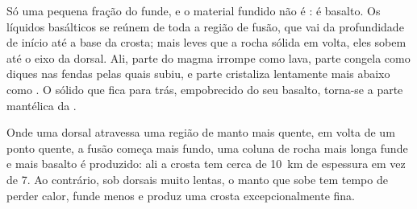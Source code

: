 Só uma pequena fração do  funde, e o material fundido não é
: é basalto. Os líquidos basálticos se reúnem de toda a região de
fusão, que vai da profundidade de início até a base da crosta; mais leves
que a rocha sólida em volta, eles sobem até o eixo da dorsal. Ali, parte do
magma irrompe como lava, parte congela como diques nas fendas pelas quais
subiu, e parte cristaliza lentamente mais abaixo como . O 
sólido que fica para trás, empobrecido do seu basalto, torna-se a parte
mantélica da .

Onde uma dorsal atravessa uma região de manto mais quente, em volta de um
ponto quente, a fusão começa mais fundo, uma coluna de rocha mais longa
funde e mais basalto é produzido: ali a crosta tem cerca de \qty{10}{km} de
espessura em vez de 7. Ao contrário, sob dorsais muito lentas, o manto que
sobe tem tempo de perder calor, funde menos e produz uma crosta
excepcionalmente fina.

